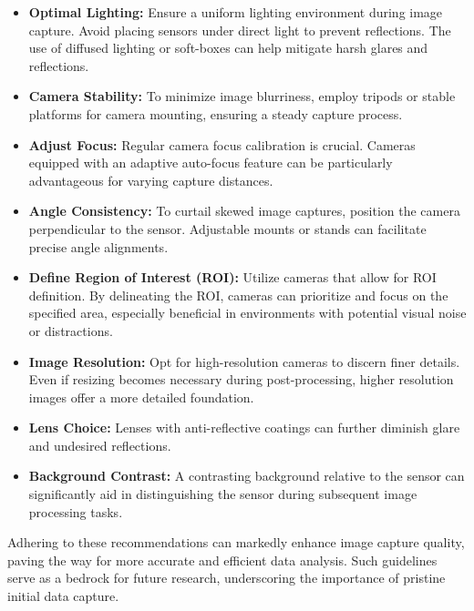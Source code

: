 \begin{itemize}
    \item \textbf{Optimal Lighting:} Ensure a uniform lighting environment during image capture. Avoid placing sensors under direct light to prevent reflections. The use of diffused lighting or soft-boxes can help mitigate harsh glares and reflections.

    \item \textbf{Camera Stability:} To minimize image blurriness, employ tripods or stable platforms for camera mounting, ensuring a steady capture process.

    \item \textbf{Adjust Focus:} Regular camera focus calibration is crucial. Cameras equipped with an adaptive auto-focus feature can be particularly advantageous for varying capture distances.

    \item \textbf{Angle Consistency:} To curtail skewed image captures, position the camera perpendicular to the sensor. Adjustable mounts or stands can facilitate precise angle alignments.

    \item \textbf{Define Region of Interest (ROI):} Utilize cameras that allow for ROI definition. By delineating the ROI, cameras can prioritize and focus on the specified area, especially beneficial in environments with potential visual noise or distractions.

    \item \textbf{Image Resolution:} Opt for high-resolution cameras to discern finer details. Even if resizing becomes necessary during post-processing, higher resolution images offer a more detailed foundation.

    \item \textbf{Lens Choice:} Lenses with anti-reflective coatings can further diminish glare and undesired reflections.

    \item \textbf{Background Contrast:} A contrasting background relative to the sensor can significantly aid in distinguishing the sensor during subsequent image processing tasks.
\end{itemize}

Adhering to these recommendations can markedly enhance image capture quality, paving the way for more accurate and efficient data analysis. Such guidelines serve as a bedrock for future research, underscoring the importance of pristine initial data capture.

